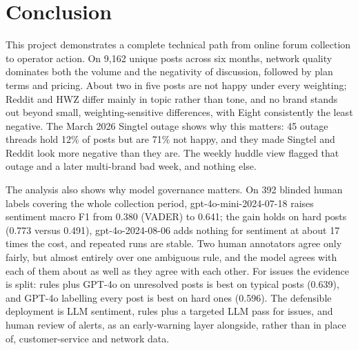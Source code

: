\documentclass[11pt,a4paper]{article}
\begin{document}
\section{Conclusion}

This project demonstrates a complete technical path from online forum collection to operator action. On 9,162 unique posts across six months, network quality dominates both the volume and the negativity of discussion, followed by plan terms and pricing. About two in five posts are not happy under every weighting; Reddit and HWZ differ mainly in topic rather than tone, and no brand stands out beyond small, weighting-sensitive differences, with Eight consistently the least negative. The March 2026 Singtel outage shows why this matters: 45 outage threads hold 12\% of posts but are 71\% not happy, and they made Singtel and Reddit look more negative than they are. The weekly huddle view flagged that outage and a later multi-brand bad week, and nothing else.

The analysis also shows why model governance matters. On 392 blinded human labels covering the whole collection period, gpt-4o-mini-2024-07-18 raises sentiment macro F1 from 0.380 (VADER) to 0.641; the gain holds on hard posts (0.773 versus 0.491), gpt-4o-2024-08-06 adds nothing for sentiment at about 17 times the cost, and repeated runs are stable. Two human annotators agree only fairly, but almost entirely over one ambiguous rule, and the model agrees with each of them about as well as they agree with each other. For issues the evidence is split: rules plus GPT-4o on unresolved posts is best on typical posts (0.639), and GPT-4o labelling every post is best on hard ones (0.596). The defensible deployment is LLM sentiment, rules plus a targeted LLM pass for issues, and human review of alerts, as an early-warning layer alongside, rather than in place of, customer-service and network data.
\end{document}
